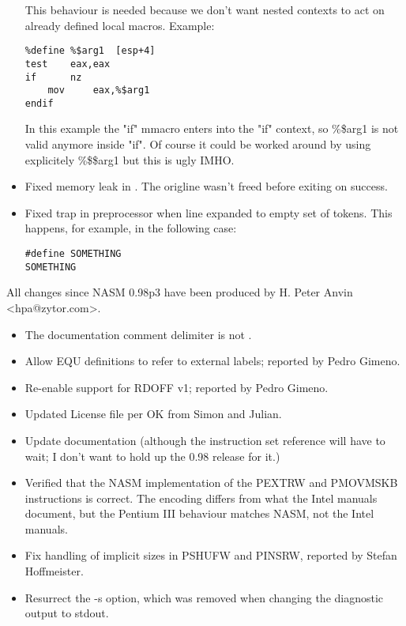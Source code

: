 \begin{itemize}
{        This behaviour is needed because we don't want nested contexts to
        act on already defined local macros. Example:
\begin{lstlisting}
%define %$arg1  [esp+4]
test    eax,eax
if      nz
    mov     eax,%$arg1
endif
\end{lstlisting}
        In this example the "if" mmacro enters into the "if" context, so \%\$arg1
        is not valid anymore inside "if". Of course it could be worked around
        by using explicitely \%\$\$arg1 but this is ugly IMHO.}
    \item{Fixed memory leak in . The origline wasn't freed before exiting on success.}
    \item{Fixed trap in preprocessor when line expanded to empty set of tokens.
        This happens, for example, in the following case:
\begin{lstlisting}
#define SOMETHING
SOMETHING
\end{lstlisting}}
\end{itemize}


All changes since NASM 0.98p3 have been produced by H. Peter Anvin <hpa@zytor.com>.

\begin{itemize}
    \item{The documentation comment delimiter is \code{\textbackslash \#} not \code{\#}.}
    \item{Allow EQU definitions to refer to external labels; reported by Pedro Gimeno.}
    \item{Re-enable support for RDOFF v1; reported by Pedro Gimeno.}
    \item{Updated License file per OK from Simon and Julian.}
\end{itemize}


\begin{itemize}
    \item{Update documentation (although the instruction set reference will
        have to wait; I don't want to hold up the 0.98 release for it.)}
    \item{Verified that the NASM implementation of the PEXTRW and PMOVMSKB
        instructions is correct. The encoding differs from what the Intel
        manuals document, but the Pentium III behaviour matches NASM, not
        the Intel manuals.}
    \item{Fix handling of implicit sizes in PSHUFW and PINSRW, reported by
        Stefan Hoffmeister.}
    \item{Resurrect the -s option, which was removed when changing the
        diagnostic output to stdout.}
\end{itemize}

